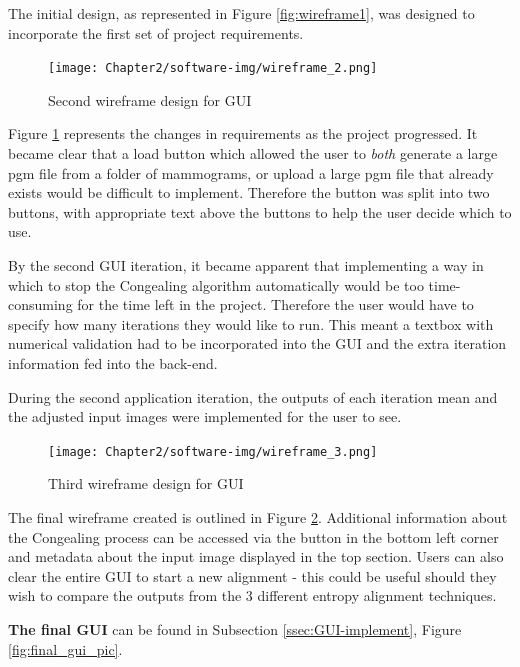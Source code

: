 The initial design, as represented in Figure \ref{fig:wireframe1}, was designed to incorporate the first set of project requirements.

\begin{figure}[H]
  \center
  \texttt{[image: Chapter2/software-img/wireframe\_2.png]}
  \caption{Second wireframe design for GUI}
  \label{fig:wireframe2}
\end{figure}

Figure \ref{fig:wireframe2} represents the changes in requirements as the project progressed. It became clear that a load button which allowed the user to \textit{both} generate a large pgm file from a folder of mammograms, or upload a large pgm file that already exists would be difficult to implement. Therefore the button was split into two buttons, with appropriate text above the buttons to help the user decide which to use.

By the second \acrshort{GUI} iteration, it became apparent that implementing a way in which to stop the \Gls{Congealing} algorithm automatically would be too time-consuming for the time left in the project. Therefore the user would have to specify how many iterations they would like to run. This meant a textbox with numerical validation had to be incorporated into the \acrshort{GUI} and the extra iteration information fed into the back-end.

During the second application iteration, the outputs of each iteration mean and the adjusted input images were implemented for the user to see.

\begin{figure}[H]
  \center
  \texttt{[image: Chapter2/software-img/wireframe\_3.png]}
  \caption{Third wireframe design for GUI}
  \label{fig:wireframe3}
\end{figure}

The final wireframe created is outlined in Figure \ref{fig:wireframe3}. Additional information  about the \Gls{Congealing} process can be accessed via the button in the bottom left corner and metadata about the input image displayed in the top section. Users can also clear the entire \acrshort{GUI} to start a new alignment - this could be useful should they wish to compare the outputs from the 3 different entropy alignment techniques.

\noindent \textbf{The final \acrshort{GUI}} can be found in Subsection \ref{ssec:GUI-implement}, Figure \ref{fig:final_gui_pic}.
